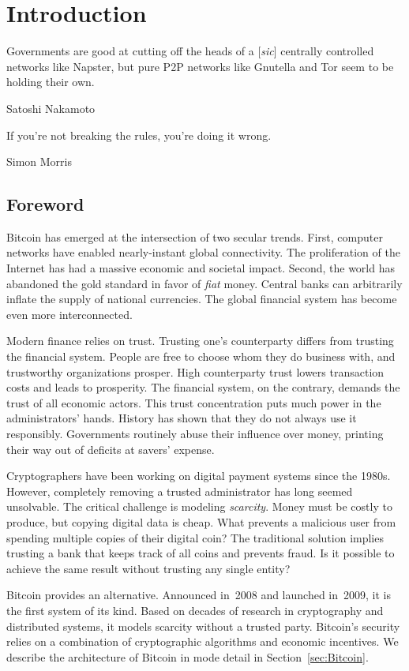 \chapter{Introduction}

\label{Chapter01Introduction}

\epigraph{Governments are good at cutting off the heads of a [\textit{sic}] centrally controlled networks like Napster, but pure P2P networks like Gnutella and Tor seem to be holding their own.}{Satoshi Nakamoto~\cite{Nakamoto2008}}
\epigraph{If you're not breaking the rules, you're doing it wrong.}{Simon Morris~\cite{Morris2018}}


\section{Foreword}

Bitcoin has emerged at the intersection of two secular trends.
First, computer networks have enabled nearly-instant global connectivity.
The proliferation of the Internet has had a massive economic and societal impact.
Second, the world has abandoned the gold standard in favor of \textit{fiat} money.
Central banks can arbitrarily inflate the supply of national currencies.
The global financial system has become even more interconnected.

Modern finance relies on trust.
Trusting one's counterparty differs from trusting the financial system.
People are free to choose whom they do business with, and trustworthy organizations prosper.
High counterparty trust lowers transaction costs and leads to prosperity.
The financial system, on the contrary, demands the trust of all economic actors.
This trust concentration puts much power in the administrators' hands.
History has shown that they do not always use it responsibly.
Governments routinely abuse their influence over money, printing their way out of deficits at savers' expense.

Cryptographers have been working on digital payment systems since the 1980s.
However, completely removing a trusted administrator has long seemed unsolvable.
The critical challenge is modeling \textit{scarcity}.
Money must be costly to produce, but copying digital data is cheap.
What prevents a malicious user from spending multiple copies of their digital coin?
The traditional solution implies trusting a bank that keeps track of all coins and prevents fraud.
Is it possible to achieve the same result without trusting any single entity?

Bitcoin provides an alternative.
Announced in~2008 and launched in~2009, it is the first system of its kind.
Based on decades of research in cryptography and distributed systems, it models scarcity without a trusted party.
Bitcoin's security relies on a combination of cryptographic algorithms and economic incentives.
We describe the architecture of Bitcoin in mode detail in Section~\ref{sec:Bitcoin}.

